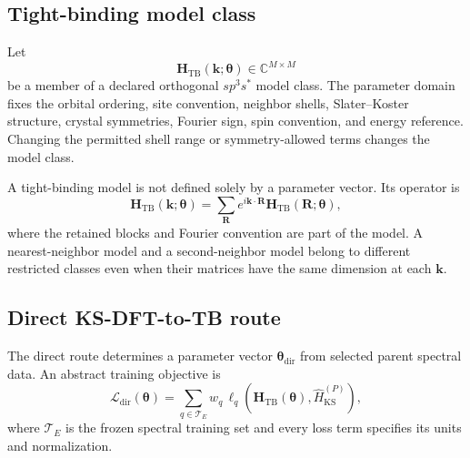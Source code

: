 
\subsection{Tight-binding model class}

Let
\begin{equation}
    \mathbf H_{\mathrm{TB}}(\mathbf k;\boldsymbol\theta)
    \in
    \mathbb C^{M\times M}
\end{equation}
be a member of a declared orthogonal $sp^3s^{\ast}$ model class. The parameter
domain fixes the orbital ordering, site convention, neighbor shells,
Slater--Koster structure, crystal symmetries, Fourier sign, spin convention,
and energy reference. Changing the permitted shell range or symmetry-allowed
terms changes the model class.

A tight-binding model is not defined solely by a parameter vector. Its
operator is
\begin{equation}
    \mathbf H_{\mathrm{TB}}(\mathbf k;\boldsymbol\theta)
    =
    \sum_{\mathbf R}
    e^{i\mathbf k\cdot\mathbf R}
    \mathbf H_{\mathrm{TB}}(\mathbf R;\boldsymbol\theta),
\end{equation}
where the retained blocks and Fourier convention are part of the model. A
nearest-neighbor model and a second-neighbor model belong to different
restricted classes even when their matrices have the same dimension at each
$\mathbf k$.


\subsection{Direct KS-DFT-to-TB route}


The direct route determines a parameter vector
$\boldsymbol\theta_{\mathrm{dir}}$ from selected parent spectral data. An
abstract training objective is
\begin{equation}
    \mathcal L_{\mathrm{dir}}(\boldsymbol\theta)
    =
    \sum_{q\in\mathcal T_E}
    w_q\,
    \ell_q
    \left(
        \mathbf H_{\mathrm{TB}}(\boldsymbol\theta),
        \hat H_{\mathrm{KS}}^{(P)}
    \right),
\end{equation}
where $\mathcal T_E$ is the frozen spectral training set and every loss term
specifies its units and normalization.

